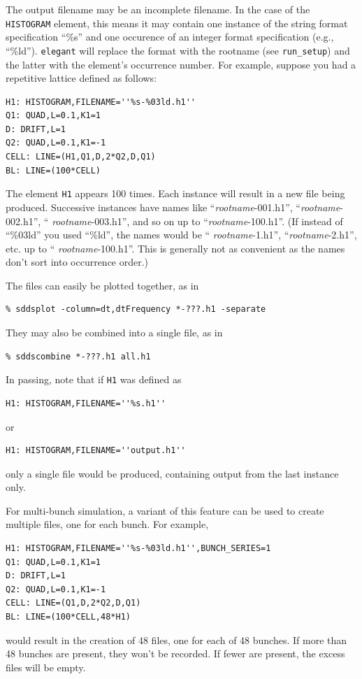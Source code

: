 The output filename may be an incomplete filename.  In the case of the
\verb|HISTOGRAM| element, this means it may contain one instance of
the string format specification ``\%s'' and one occurence of an
integer format specification (e.g., ``\%ld'').  {\tt elegant} will
replace the format with the rootname (see
\verb|run_setup|) and the latter with the element's occurrence
number.  For example, suppose you had a repetitive lattice defined as
follows:
\begin{verbatim}
H1: HISTOGRAM,FILENAME=''%s-%03ld.h1''
Q1: QUAD,L=0.1,K1=1
D: DRIFT,L=1
Q2: QUAD,L=0.1,K1=-1
CELL: LINE=(H1,Q1,D,2*Q2,D,Q1)
BL: LINE=(100*CELL)
\end{verbatim}
The element \verb|H1| appears 100 times.  Each instance will result in
a new file being produced.  Successive instances have names like
``{\em rootname}-001.h1'', ``{\em rootname}-002.h1'', ``{\em
rootname}-003.h1'', and so on up to ``{\em rootname}-100.h1''.  (If
instead of ``\%03ld'' you used ``\%ld'', the names would be ``{\em
rootname}-1.h1'', ``{\em rootname}-2.h1'', etc. up to ``{\em
rootname}-100.h1''.  This is generally not as convenient as the names
don't sort into occurrence order.)

The files can easily be plotted together, as in 
\begin{verbatim}
% sddsplot -column=dt,dtFrequency *-???.h1 -separate 
\end{verbatim}
They may also be combined into a single file, as in
\begin{verbatim}
% sddscombine *-???.h1 all.h1 
\end{verbatim}

In passing, note that if \verb|H1| was defined as
\begin{verbatim}
H1: HISTOGRAM,FILENAME=''%s.h1''
\end{verbatim}
or 
\begin{verbatim}
H1: HISTOGRAM,FILENAME=''output.h1''
\end{verbatim}
only a single file would be produced, containing output from the last instance
only.

For multi-bunch simulation, a variant of this feature can be used to create multiple files, one for
each bunch. For example,
\begin{verbatim}
H1: HISTOGRAM,FILENAME=''%s-%03ld.h1'',BUNCH_SERIES=1
Q1: QUAD,L=0.1,K1=1
D: DRIFT,L=1
Q2: QUAD,L=0.1,K1=-1
CELL: LINE=(Q1,D,2*Q2,D,Q1)
BL: LINE=(100*CELL,48*H1)
\end{verbatim}
would result in the creation of 48 files, one for each of 48 bunches. If more than 48 bunches are present,
they won't be recorded. If fewer are present, the excess files will be empty.

